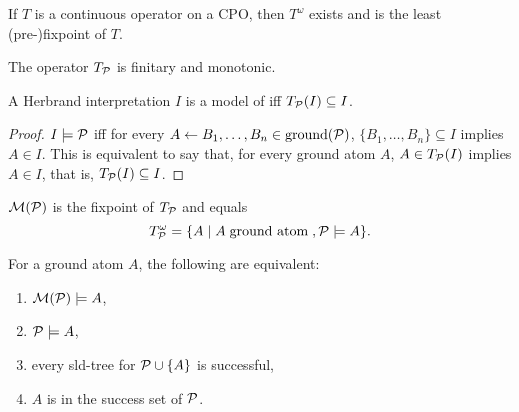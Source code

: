 \begin{thm}
    If \(T\) is a continuous operator on a CPO, then \(T^\omega\) exists and is the least (pre-)fixpoint of \(T\).
\end{thm}

\begin{lem}
    The operator \(T_\mathcal{P}\) is finitary and monotonic.
\end{lem}

\begin{lem}
    A Herbrand interpretation \(I\) is a model of \prog iff \(T_\mathcal{P}(I) \subseteq I\).
\end{lem}
\begin{proof}
    \(I \models \mathcal{P}\) iff for every \(A \leftarrow B_1,\dotsc,B_n \in \operatorname{ground}(\mathcal{P})\), \(\lbrace B_1,\dotsc,B_n \rbrace \subseteq I\) implies \(A \in I\).
    This is equivalent to say that, for every ground atom \(A\), \(A \in T_\mathcal{P}(I)\) implies \(A \in I\), that is, \(T_\mathcal{P}(I) \subseteq I\).
\end{proof}

\begin{thm}
    \(\mathcal{M}(\mathcal{P})\) is the fixpoint of \(T_\mathcal{P}\) and equals 
    \begin{equation*}
        T_\mathcal{P}^\omega = \lbrace A \mid A\;\text{ground atom}\;,\mathcal{P}\models A \rbrace.
    \end{equation*}
\end{thm}

\begin{thm}
    For a ground atom \(A\), the following are equivalent:
    \begin{enumerate}
        \item \(\mathcal{M}(\mathcal{P}) \models A\),
        \item \(\mathcal{P} \models A\),
        \item every \gls{sld}-tree for \(\mathcal{P} \cup \lbrace A \rbrace\) is successful,
        \item \(A\) is in the success set of \(\mathcal{P}\).
    \end{enumerate}
\end{thm}
